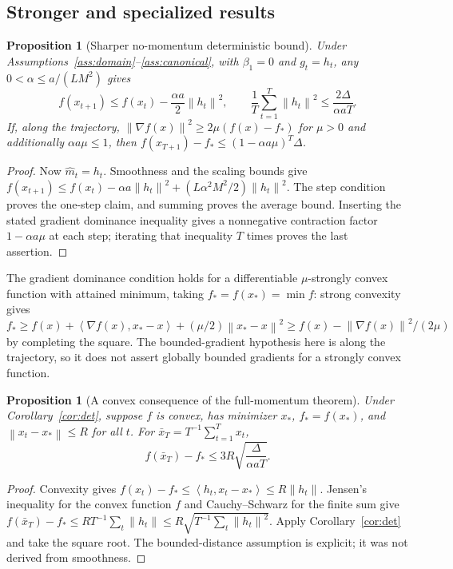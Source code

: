 \documentclass[11pt,a4paper]{article}
\newtheorem{proposition}[theorem]{Proposition}
\theoremstyle{definition}
\theoremstyle{remark}
\newcommand{\norm}[1]{\left\lVert#1\right\rVert}
\newcommand{\ip}[2]{\left\langle#1,#2\right\rangle}
\begin{document}
\subsection{Stronger and specialized results}\label{sec:special}
\begin{proposition}[Sharper no-momentum deterministic bound]\label{prop:nomomentum}
Under Assumptions~\ref{ass:domain}--\ref{ass:canonical}, with $\beta_1=0$
and $g_t=h_t$, any $0<\alpha\le a/(LM^2)$ gives
\[
 f(x_{t+1})\le f(x_t)-\frac{\alpha a}{2}\norm{h_t}^2,\qquad
 \frac1T\sum_{t=1}^T\norm{h_t}^2\le\frac{2\Delta}{\alpha aT}.
\]
If, along the trajectory, $\norm{\nabla f(x)}^2\ge2\mu(f(x)-f_*)$ for
$\mu>0$ and additionally $\alpha a\mu\le1$, then
$f(x_{T+1})-f_*\le(1-\alpha a\mu)^T\Delta$.
\end{proposition}
\begin{proof}
Now $\widehat m_t=h_t$. Smoothness and the scaling bounds give
$f(x_{t+1})\le f(x_t)-\alpha a\norm{h_t}^2+
(L\alpha^2M^2/2)\norm{h_t}^2$. The step condition proves the one-step claim,
and summing proves the average bound. Inserting the stated gradient dominance
inequality gives a nonnegative contraction factor $1-\alpha a\mu$ at each
step; iterating that inequality $T$ times proves the last assertion.
\end{proof}
The gradient dominance condition holds for a differentiable
$\mu$-strongly convex function with attained minimum, taking
$f_*=f(x_*)=\min f$: strong convexity gives
$f_*\ge f(x)+\ip{\nabla f(x)}{x_*-x}+(\mu/2)\norm{x_*-x}^2
\ge f(x)-\norm{\nabla f(x)}^2/(2\mu)$ by completing the square.
The bounded-gradient hypothesis here is along the trajectory, so it does not
assert globally bounded gradients for a strongly convex function.

\begin{proposition}[A convex consequence of the full-momentum theorem]
Under Corollary~\ref{cor:det}, suppose $f$ is convex, has minimizer $x_*$,
$f_*=f(x_*)$, and $\norm{x_t-x_*}\le R$ for all $t$. For
$\bar x_T=T^{-1}\sum_{t=1}^T x_t$,
\[
 f(\bar x_T)-f_*\le3R\sqrt{\frac{\Delta}{\alpha aT}}.
\]
\end{proposition}
\begin{proof}
Convexity gives $f(x_t)-f_*\le\ip{h_t}{x_t-x_*}\le R\norm{h_t}$.
Jensen's inequality for the convex function $f$ and Cauchy--Schwarz for the
finite sum give
$f(\bar x_T)-f_*\le R T^{-1}\sum_t\norm{h_t}
\le R\sqrt{T^{-1}\sum_t\norm{h_t}^2}$.
Apply Corollary~\ref{cor:det} and take the square root.
The bounded-distance assumption is explicit; it was not derived from smoothness.
\end{proof}
\end{document}
